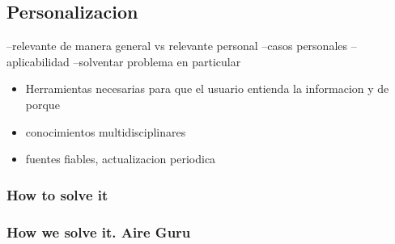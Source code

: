 \subsection{Personalizacion}
 
    --relevante de manera general vs relevante personal
    --casos personales
    --aplicabilidad
    --solventar problema en particular
    
    
    
    \begin{itemize}
    
          \item Herramientas necesarias para que el usuario entienda la informacion y de porque
     \item conocimientos multidisciplinares
        \item fuentes fiables, actualizacion periodica
    \end{itemize}
  

\subsubsection{How to solve it} 


\subsubsection{How we solve it. Aire Guru} 
 
\begin{itemize}
    \done
    \crossed
    
\end{itemize}
 \newpage